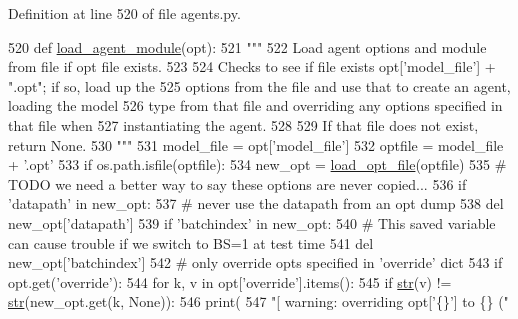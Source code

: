 Definition at line 520 of file agents.\+py.


\begin{DoxyCode}
520 \textcolor{keyword}{def }\hyperlink{namespaceparlai_1_1core_1_1agents_a213df46dd21144eb4c056bb58c294c5d}{load\_agent\_module}(opt):
521     \textcolor{stringliteral}{"""}
522 \textcolor{stringliteral}{    Load agent options and module from file if opt file exists.}
523 \textcolor{stringliteral}{}
524 \textcolor{stringliteral}{    Checks to see if file exists opt['model\_file'] + ".opt"; if so, load up the}
525 \textcolor{stringliteral}{    options from the file and use that to create an agent, loading the model}
526 \textcolor{stringliteral}{    type from that file and overriding any options specified in that file when}
527 \textcolor{stringliteral}{    instantiating the agent.}
528 \textcolor{stringliteral}{}
529 \textcolor{stringliteral}{    If that file does not exist, return None.}
530 \textcolor{stringliteral}{    """}
531     model\_file = opt[\textcolor{stringliteral}{'model\_file'}]
532     optfile = model\_file + \textcolor{stringliteral}{'.opt'}
533     \textcolor{keywordflow}{if} os.path.isfile(optfile):
534         new\_opt = \hyperlink{namespaceparlai_1_1utils_1_1misc_a7c97ef3250327bc549ac652a481be0cf}{load\_opt\_file}(optfile)
535         \textcolor{comment}{# TODO we need a better way to say these options are never copied...}
536         \textcolor{keywordflow}{if} \textcolor{stringliteral}{'datapath'} \textcolor{keywordflow}{in} new\_opt:
537             \textcolor{comment}{# never use the datapath from an opt dump}
538             del new\_opt[\textcolor{stringliteral}{'datapath'}]
539         \textcolor{keywordflow}{if} \textcolor{stringliteral}{'batchindex'} \textcolor{keywordflow}{in} new\_opt:
540             \textcolor{comment}{# This saved variable can cause trouble if we switch to BS=1 at test time}
541             del new\_opt[\textcolor{stringliteral}{'batchindex'}]
542         \textcolor{comment}{# only override opts specified in 'override' dict}
543         \textcolor{keywordflow}{if} opt.get(\textcolor{stringliteral}{'override'}):
544             \textcolor{keywordflow}{for} k, v \textcolor{keywordflow}{in} opt[\textcolor{stringliteral}{'override'}].items():
545                 \textcolor{keywordflow}{if} \hyperlink{namespacegenerate__task__READMEs_a5b88452ffb87b78c8c85ececebafc09f}{str}(v) != \hyperlink{namespacegenerate__task__READMEs_a5b88452ffb87b78c8c85ececebafc09f}{str}(new\_opt.get(k, \textcolor{keywordtype}{None})):
546                     print(
547                         \textcolor{stringliteral}{"[ warning: overriding opt['\{\}'] to \{\} ("}

\end{DoxyCode}
